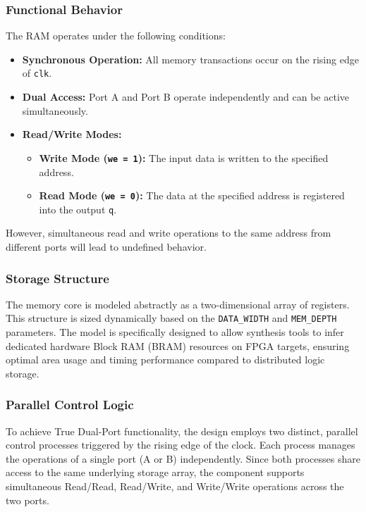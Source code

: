 \subsubsection{Functional Behavior}
The RAM operates under the following conditions:
\begin{itemize}
    \item \textbf{Synchronous Operation:} All memory transactions occur on the rising edge of \texttt{clk}.
    \item \textbf{Dual Access:} Port A and Port B operate independently and can be active simultaneously.
    \item \textbf{Read/Write Modes:}
    \begin{itemize}
        \item \textbf{Write Mode (\texttt{we = 1}):} The input data is written to the specified address.
        \item \textbf{Read Mode (\texttt{we = 0}):} The data at the specified address is registered into the output \texttt{q}.
    \end{itemize}
\end{itemize}
However, simultaneous read and write operations to the same address from different ports will lead to undefined behavior.

\subsubsection{Storage Structure}
The memory core is modeled abstractly as a two-dimensional array of registers. This structure is sized dynamically based on the \texttt{DATA\_WIDTH} and \texttt{MEM\_DEPTH} parameters. The model is specifically designed to allow synthesis tools to infer dedicated hardware Block RAM (BRAM) resources on FPGA targets, ensuring optimal area usage and timing performance compared to distributed logic storage.

\subsubsection{Parallel Control Logic}
To achieve True Dual-Port functionality, the design employs two distinct, parallel control processes triggered by the rising edge of the clock. Each process manages the operations of a single port (A or B) independently. Since both processes share access to the same underlying storage array, the component supports simultaneous Read/Read, Read/Write, and Write/Write operations across the two ports.

